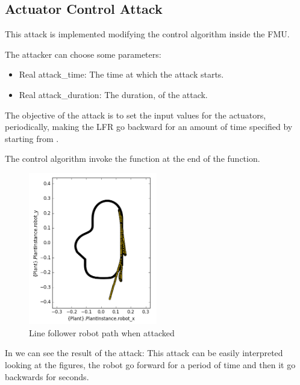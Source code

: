 \subsection{Actuator Control Attack}

This attack is implemented modifying the control algorithm inside the
 FMU\@.

The attacker can choose some parameters:
\begin{itemize}
\item Real attack\_time: The time at which the attack starts.
\item Real attack\_duration: The duration, of the attack.
\end{itemize}

The objective of the attack is to set the input values for the actuators,
periodically, making the LFR go backward for an amount of time specified by
 starting from .

The control algorithm invoke the  function at
the end of the  function. 



\begin{figure}[htb]
	\centering
	\includegraphics[width=0.5\textwidth]{img/actuator_attack_control.png}
	\caption{Line follower robot path when
	attacked}\label{fig:actuatorcontrolresult}
\end{figure}

In  we can see the result of the attack: This
attack can be easily interpreted looking at the figures, the robot go forward
for a period of time and then it go backwards for 
seconds.

